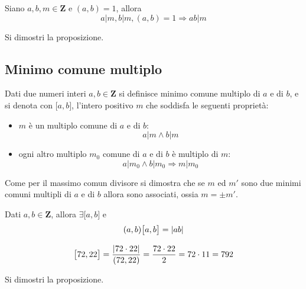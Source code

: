 \begin{flushleft}
\begin{proposizione}
Siano $a, b, m\in \mathbf{Z}$ e $(a, b) = 1$, allora
\[a|m, b|m, (a, b)=1 \Rightarrow ab|m\]
\end{proposizione}
\begin{esercizio}
Si dimostri la proposizione.
\end{esercizio}
\vspace{100px}


\subsection{Minimo comune multiplo}
\begin{definizione}

\end{definizione}
Dati due numeri interi $a, b \in \mathbf{Z}$ si definisce minimo comune multiplo di $a$ e di $b$, e si denota con $\big[a,b\big]$, l'intero positivo $m$ che soddisfa le seguenti proprietà:
\begin{itemize}
    \item $m$ è un multiplo comune di $a$ e di $b$:
    \[a|m \land b|m\]
    \item ogni altro multiplo $m_0$ comune di $a$ e di $b$ è multiplo di $m$:
    \[a|m_0\land b|m_0 \Rightarrow m|m_0\]
\end{itemize}
\begin{osservazione}
Come per il massimo comun divisore si dimostra che se $m$ ed $m'$ sono due minimi comuni multipli di $a$ e di $b$ allora sono associati, ossia $m = \pm m'$.
\end{osservazione}





\begin{theorem}
Dati $a, b \in \mathbf{Z}$, allora $\exists\big[a, b\big]$ e 
\[(a, b)\big[a, b\big] = \abs{ab}\]
\end{theorem}
\begin{esempio}
\[\big[72, 22\big] = \frac{\abs{72\cdot 22}}{(72, 22)} = \frac{72\cdot 22}{2} = 72     \cdot 11 = 792\]
\end{esempio}

\begin{esercizio}
Si dimostri la proposizione.
\end{esercizio}
\vspace{200px}


\end{flushleft}
